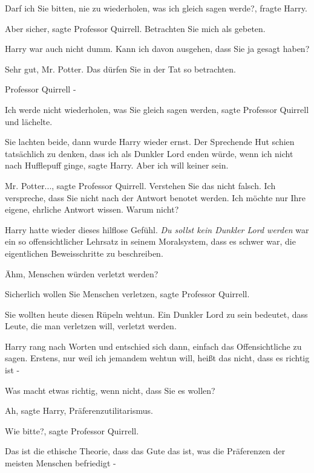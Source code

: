 \glqq{}Darf ich Sie bitten, nie zu wiederholen, was ich gleich sagen
werde?\grqq{}, fragte Harry.

\glqq{}Aber sicher\grqq{}, sagte Professor Quirrell. \glqq{}Betrachten Sie mich
als gebeten.\grqq{}

Harry war auch nicht dumm. \glqq{}Kann ich davon ausgehen, dass Sie ja gesagt
haben?\grqq{}

\glqq{}Sehr gut, Mr. Potter. Das dürfen Sie in der Tat so betrachten.\grqq{}

\glqq{}Professor Quirrell -\grqq{}

\glqq{}Ich werde nicht wiederholen, was Sie gleich sagen werden\grqq{}, sagte
Professor Quirrell und lächelte.

Sie lachten beide, dann wurde Harry wieder ernst. \glqq{}Der Sprechende Hut
schien tatsächlich zu denken, dass ich als Dunkler Lord enden würde, wenn ich
nicht nach Hufflepuff ginge\grqq{}, sagte Harry. \glqq{}Aber ich will keiner
sein.\grqq{}

\glqq{}Mr. Potter...\grqq{}, sagte Professor Quirrell. \glqq{}Verstehen Sie das
nicht falsch. Ich verspreche, dass Sie nicht nach der Antwort benotet werden.
Ich möchte nur Ihre eigene, ehrliche Antwort wissen. Warum nicht?\grqq{}

Harry hatte wieder dieses hilflose Gefühl. \emph{Du sollst kein Dunkler Lord
werden} war ein so offensichtlicher Lehrsatz in seinem Moralsystem, dass es
schwer war, die eigentlichen Beweisschritte zu beschreiben.

\glqq{}Ähm, Menschen würden verletzt werden?\grqq{}

\glqq{}Sicherlich wollen Sie Menschen verletzen\grqq{}, sagte Professor Quirrell.

\glqq{}Sie wollten heute diesen Rüpeln wehtun. Ein Dunkler Lord zu sein bedeutet,
dass Leute, die man verletzen will, verletzt werden.\grqq{}

Harry rang nach Worten und entschied sich dann, einfach das Offensichtliche zu
sagen. \glqq{}Erstens, nur weil ich jemandem wehtun will, heißt das nicht, dass
es richtig ist -\grqq{}

\glqq{}Was macht etwas richtig, wenn nicht, dass Sie es wollen?\grqq{}

\glqq{}Ah\grqq{}, sagte Harry, \glqq{}Präferenzutilitarismus.\grqq{}

\glqq{}Wie bitte?\grqq{}, sagte Professor Quirrell.

\glqq{}Das ist die ethische Theorie, dass das Gute das ist, was die Präferenzen
der meisten Menschen befriedigt -\grqq{}


